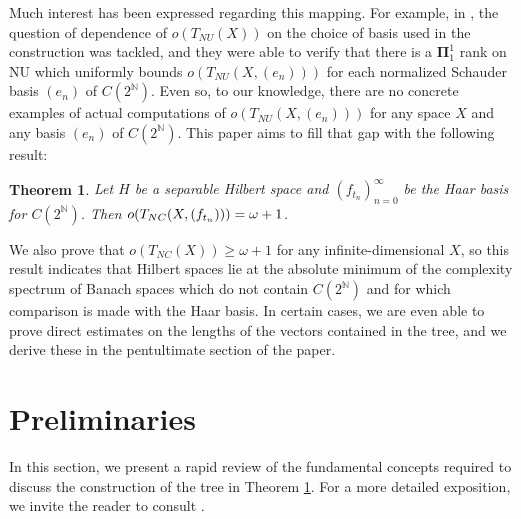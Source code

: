 \documentclass{article}
\newtheorem{theorem}{Theorem}
\newcommand{\N}{\mathbb N}
\begin{document}
Much interest has been expressed regarding this mapping. For example, in \cite{AD}, the question of dependence of $o(T_{NU}(X))$ on the choice of basis used in the construction was tackled, and they were able to verify that there is a $\boldsymbol\Pi_1^1$ rank on NU which uniformly bounds $o(T_{NU}(X,(e_n)))$ for each normalized Schauder basis $(e_n)$ of $C(2^\N)$. Even so, to our knowledge, there are no concrete examples of actual computations of $o(T_{NU}(X,(e_n)))$ for any space $X$ and any basis $(e_n)$ of $C(2^\N)$. This paper aims to fill that gap with the following result:

\begin{theorem}\label{MR}
Let $H$ be a separable Hilbert space and $(f_{t_n})_{n=0}^\infty$ be the Haar basis for $C(2^\N)$. Then $\\o(T_{NC}(X,(f_{t_n}))) = \omega + 1$.
\end{theorem}

We also prove that $o(T_{NC}(X))\geq\omega + 1$ for any infinite-dimensional $X$, so this result indicates that Hilbert spaces lie at the absolute minimum of the complexity spectrum of Banach spaces which do not contain $C(2^\N)$ and for which comparison is made with the Haar basis. In certain cases, we are even able to prove direct estimates on the lengths of the vectors contained in the tree, and we derive these in the pentultimate section of the paper.

\section{Preliminaries}
In this section, we present a rapid review of the fundamental concepts required to discuss the construction of the tree in Theorem \ref{MR}. For a more detailed exposition, we invite the reader to consult \cite{K}. 
\end{document}
